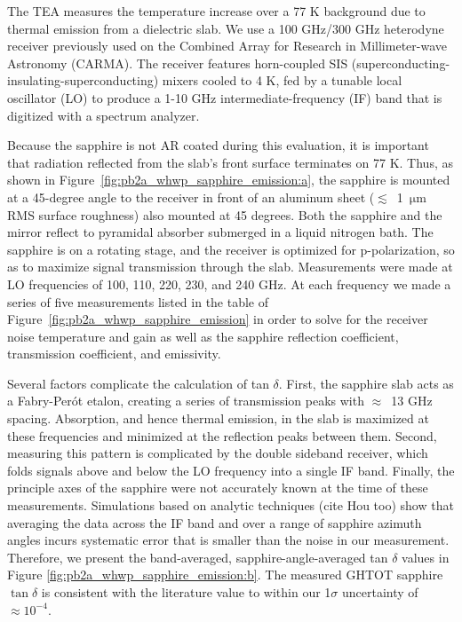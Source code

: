 \begin{figure}[!t]
\end{figure}

The TEA measures the temperature increase over a 77 K background due to thermal emission from a dielectric slab. We use a 100 GHz/300 GHz heterodyne receiver previously used on the Combined Array for Research in Millimeter-wave Astronomy (CARMA). The receiver features horn-coupled SIS (superconducting-insulating-superconducting) mixers cooled to 4 K, fed by a tunable local oscillator (LO) to produce a 1-10 GHz intermediate-frequency (IF) band that is digitized with a spectrum analyzer. 

Because the sapphire is not AR coated during this evaluation, it is important that radiation reflected from the slab's front surface terminates on 77 K. Thus, as shown in Figure~\ref{fig:pb2a_whwp_sapphire_emission:a}, the sapphire is mounted at a 45-degree angle to the receiver in front of an aluminum sheet ($\lesssim$~1~$\mathrm{\mu m}$ RMS surface roughness) also mounted at 45 degrees. Both the sapphire and the mirror reflect to pyramidal absorber submerged in a liquid nitrogen bath. The sapphire is on a rotating stage, and the receiver is optimized for p-polarization, so as to maximize signal transmission through the slab. Measurements were made at LO frequencies of 100, 110, 220, 230, and 240 GHz. At each frequency we made a series of five measurements listed in the table of Figure~\ref{fig:pb2a_whwp_sapphire_emission} in order to solve for the receiver noise temperature and gain as well as the sapphire reflection coefficient, transmission coefficient, and emissivity.

Several factors complicate the calculation of tan $\delta$. First, the sapphire slab acts as a Fabry-Per\'{o}t etalon, creating a series of transmission peaks with $\approx$~13 GHz spacing. Absorption, and hence thermal emission, in the slab is maximized at these frequencies and minimized at the reflection peaks between them. Second, measuring this pattern is complicated by the double sideband receiver, which folds signals above and below the LO frequency into a single IF band. Finally, the principle axes of the sapphire were not accurately known at the time of these measurements. Simulations based on analytic techniques \cite{essinger-hileman_transfer_2013} (cite Hou too) show that averaging the data across the IF band and over a range of sapphire azimuth angles incurs systematic error that is smaller than the noise in our measurement. Therefore, we present the band-averaged, sapphire-angle-averaged tan $\delta$ values in Figure \ref{fig:pb2a_whwp_sapphire_emission:b}. The measured GHTOT sapphire $\tan \delta$ is consistent with the literature value \cite{parshin} to within our 1$\sigma$ uncertainty of $\approx 10^{-4}$.

